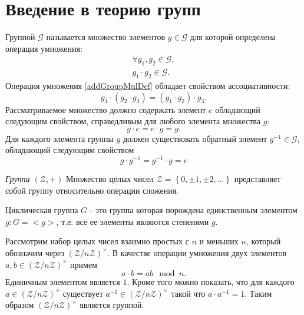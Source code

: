 \section{Введение в теорию групп}
\begin{definition}
Группой $\mathcal{G}$ называется множество элементов $g \in
\mathcal{G}$ для которой определена 
операция умножения:
\begin{eqnarray}
\forall g_1,g_2 \in \mathcal{G},
\nonumber \\
g_1 \cdot g_2 \in \mathcal{G}.
\label{addGroupMulDef}
\end{eqnarray}
Операция умножения \autoref{addGroupMulDef} обладает свойством
ассоциативности:
\begin{equation}
g_1 \cdot \left( g_2 \cdot g_3 \right ) = 
\left( g_1 \cdot  g_2 \right ) \cdot g_3.
\nonumber
\end{equation}
Рассматриваемое множество должно содержать элемент $e$ обладающий
следующим свойством, справедливым для любого элемента множества $g$:
\begin{equation}
g \cdot e = e \cdot g = g.
\nonumber
\end{equation}
Для каждого элемента группы $g$ должен существовать обратный
элемент $g^{-1} \in \mathcal{G}$, обладающий следующим свойством
\begin{equation}
g \cdot g^{-1} = g^{-1} \cdot g = e
\nonumber
\end{equation}
\label{defAddGroup}
\end{definition}

\begin{example}
\emph{Группа $\left(\mathcal{Z}, +\right)$}
Множество целых чисел $\mathcal{Z} = \left\{0, \pm1, \pm2,
\dots\right\}$ представляет собой группу относительно операции сложения.
\nonumber
\end{example}

\begin{definition}
Циклическая группа $G$ - это группа которая порождена единственным
элементом $g: G = <g>$, т.е. все ее элементы являются степенями $g$.
\label{def:add:algebra:cyclic_group}
\end{definition}

\begin{definition}
Рассмотрим набор целых чисел взаимно простых с $n$ и меньших $n$,
который обозначим через $\left(\mathcal{Z}/n\mathcal{Z}\right)^\times$. В
качестве операции умножения двух элементов $a,b \in
\left(\mathcal{Z}/n\mathcal{Z}\right)^\times$ примем
\[
a \cdot b = ab \mod n.
\]
Единичным элементом является $1$. Кроме того можно показать, что для
каждого $a \in \left(\mathcal{Z}/n\mathcal{Z}\right)^\times$
существует $a^{-1} \in \left(\mathcal{Z}/n\mathcal{Z}\right)^\times$
такой что $a \cdot a^{-1} = 1$. Таким образом
$\left(\mathcal{Z}/n\mathcal{Z}\right)^\times$ является группой.
\label{def:add:algebra:mult_group}
\end{definition}

